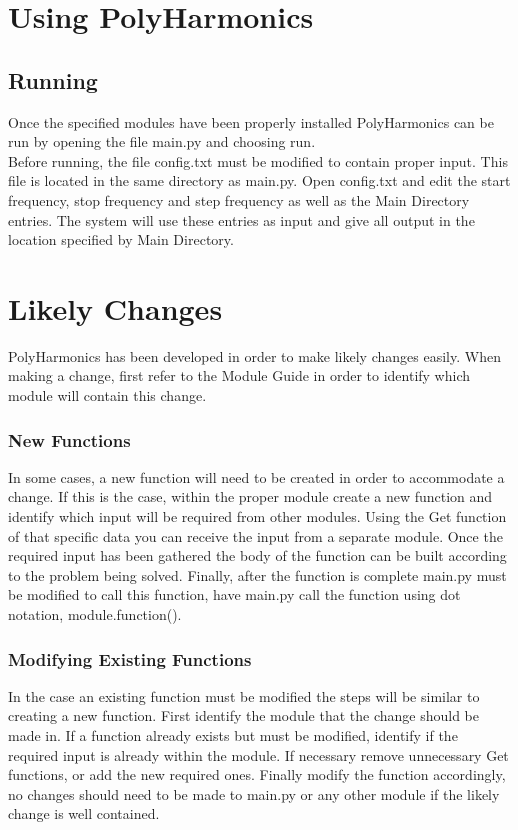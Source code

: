\documentclass[12pt]{article}
\newcommand{\progname}{PolyHarmonics}
\begin{document}
\section{Using \progname{}}

\subsection{Running}
Once the specified modules have been properly installed \progname{} can be run 
by opening the file main.py and choosing run. \\
Before running, the file config.txt must be modified to contain proper input. 
This file is located in the same directory as main.py. Open config.txt and edit 
the start frequency, stop frequency and step frequency as well as the Main 
Directory entries. The system will use these entries as input and give all 
output in the location specified by Main Directory. 

\section{Likely Changes}
\progname{} has been developed in order to make likely changes easily. 
When making a change, first refer to the Module Guide in order to identify which 
module will contain this change. 
\subsubsection{New Functions}
In some cases, a new function will need to be created in order to accommodate a 
change. If this is the case, within the proper module create a new function and 
identify which input will be required from other modules. Using the Get function 
of that specific data you can receive the input from a separate module. Once the 
required input has been gathered the body of the function can be built according 
to the problem being solved. Finally, after the function is complete main.py 
must be modified to call this function, have main.py call the function using dot 
notation, module.function().
\subsubsection{Modifying Existing Functions}
In the case an existing function must be modified the steps will be similar to 
creating a new function. First identify the module that the change should be 
made in. If a function already exists but must be modified, identify if the 
required input is already within the module. If necessary remove unnecessary Get 
functions, or add the new required ones. Finally modify the function 
accordingly, no changes should need to be made to main.py or any other module if 
the likely change is well contained.
\end{document}

